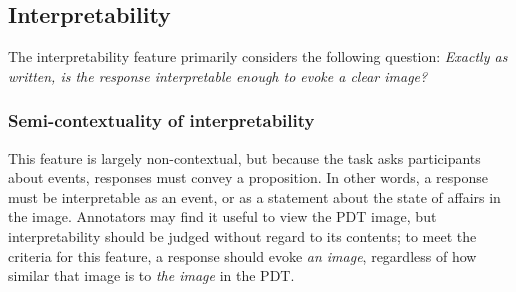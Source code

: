 \documentclass[12pt,notitlepage]{article}
\begin{document}
%
%
%

\subsection{Interpretability} \label{subsec:interpretability}
The interpretability feature primarily considers the following question: \textit{Exactly as written, is the response interpretable enough to evoke a clear image?} 

\subsubsection{Semi-contextuality of interpretability} \label{subsubsec:semicontext-interp} This feature is largely non-contextual, but because the task asks participants about events, responses must convey a proposition. In other words, a response must be interpretable as an event, or as a statement about the state of affairs in the image. Annotators may find it useful to view the PDT image, but interpretability should be judged without regard to its contents; to meet the criteria for this feature, a response should evoke \textit{an image}, regardless of how similar that image is to \textit{the image} in the PDT.
\end{document}
